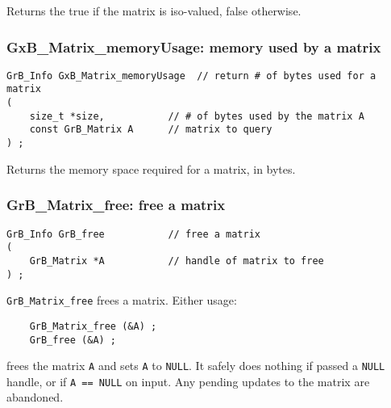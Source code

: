 \documentclass[12pt]{article}
\begin{document}
Returns the true if the matrix is iso-valued, false otherwise.

\subsubsection{{\sf GxB\_Matrix\_memoryUsage:} memory used by a matrix}
\label{matrix_memusage}

\begin{mdframed}[userdefinedwidth=6in]
{\footnotesize
\begin{verbatim}
GrB_Info GxB_Matrix_memoryUsage  // return # of bytes used for a matrix
(
    size_t *size,           // # of bytes used by the matrix A
    const GrB_Matrix A      // matrix to query
) ;
\end{verbatim} } \end{mdframed}

Returns the memory space required for a matrix, in bytes.

\subsubsection{{\sf GrB\_Matrix\_free:} free a matrix}
\label{matrix_free}

\begin{mdframed}[userdefinedwidth=6in]
{\footnotesize
\begin{verbatim}
GrB_Info GrB_free           // free a matrix
(
    GrB_Matrix *A           // handle of matrix to free
) ;
\end{verbatim} } \end{mdframed}

\verb'GrB_Matrix_free' frees a matrix.  Either usage:

    {\small
    \begin{verbatim}
    GrB_Matrix_free (&A) ;
    GrB_free (&A) ; \end{verbatim}}

\noindent
frees the matrix \verb'A' and sets \verb'A' to \verb'NULL'.  It safely does
nothing if passed a \verb'NULL' handle, or if \verb'A == NULL' on input.  Any
pending updates to the matrix are abandoned.

\newpage
\end{document}
